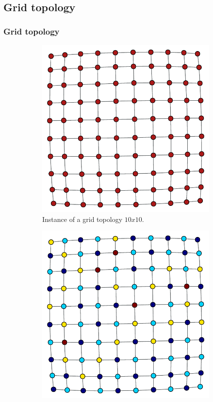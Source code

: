 \documentclass{beamer}
\begin{document}
\subsection{Grid topology}
\begin{frame}
\frametitle{Grid topology}
\begin{figure}[t]
	\centering
	\begin{subfigure}[h]{0.4\textwidth}
		\includegraphics[width=\linewidth]{Figure/grid.pdf}
		\caption{\footnotesize{Instance of a grid topology $10x10$.}}\label{fig:Grid}
	\end{subfigure}%
	\hspace{20pt}
	\begin{subfigure}[h]{0.4\textwidth}
		\includegraphics[width=\linewidth]{Figure/grid-coloration.pdf}

\end{subfigure}
\end{figure}
\end{frame}
\end{document}
